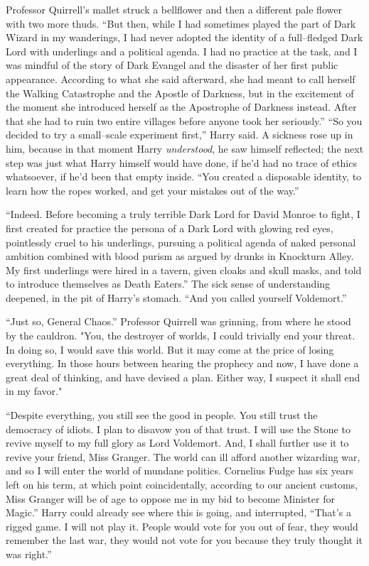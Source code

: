 Professor Quirrell’s mallet struck a bellflower and then a different pale flower with two more thuds. “But then, while I had sometimes played the part of Dark Wizard in my wanderings, I had never adopted the identity of a full\mbox{--}fledged Dark Lord with underlings and a political agenda. I had no practice at the task, and I was mindful of the story of Dark Evangel and the disaster of her first public appearance. According to what she said afterward, she had meant to call herself the Walking Catastrophe and the Apostle of Darkness, but in the excitement of the moment she introduced herself as the Apostrophe of Darkness instead. After that she had to ruin two entire villages before anyone took her seriously.”
\SmallVSpace
“So you decided to try a small\mbox{--}scale experiment first,” Harry said. A sickness rose up in him, because in that moment Harry \emph{understood}, he saw himself reflected; the next step was just what Harry himself would have done, if he’d had no trace of ethics whatsoever, if he’d been that empty inside. “You created a disposable identity, to learn how the ropes worked, and get your mistakes out of the way.”

“Indeed. Before becoming a truly terrible Dark Lord for David Monroe to fight, I first created for practice the persona of a Dark Lord with glowing red eyes, pointlessly cruel to his underlings, pursuing a political agenda of naked personal ambition combined with blood purism as argued by drunks in Knockturn Alley. My first underlings were hired in a tavern, given cloaks and skull masks, and told to introduce themselves as Death Eaters.”
\SmallVSpace
The sick sense of understanding deepened, in the pit of Harry’s stomach. “And you called yourself Voldemort.”

“Just so, General Chaos.” Professor Quirrell was grinning, from where he stood by the cauldron. "You, the destroyer of worlds, I could trivially end your threat.\\In doing so, I would save this world. But it may come at the price of losing everything. In those hours between hearing the prophecy and now, I have done a great deal of thinking, and have devised a plan. Either way, I suspect it shall end in my favor."

“Despite everything, you still see the good in people. You still trust the democracy of idiots. I plan to disavow you of that trust. I will use the Stone to revive myself to my full glory as Lord Voldemort. And, I shall further use it to revive your friend, Miss Granger. The world can ill afford another wizarding war, and so I will enter the world of mundane politics. Cornelius Fudge has six years left on his term, at which point coincidentally, according to our ancient customs, Miss Granger will be of age to oppose me in my bid to become Minister for Magic.”
\SmallVSpace
Harry could already see where this is going, and interrupted, “That’s a rigged game. I will not play it. People would vote for you out of fear, they would remember the last war, they would not vote for you because they truly thought it was right.”

